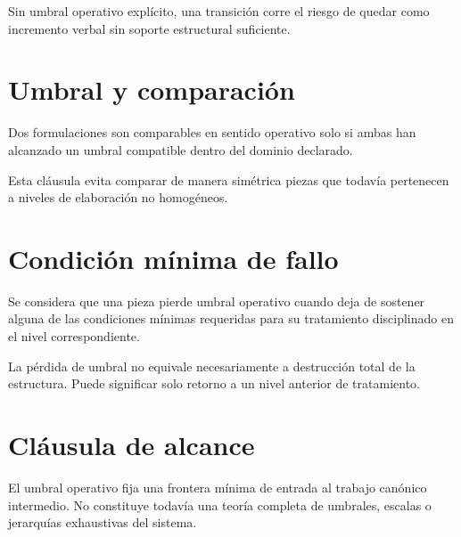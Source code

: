 \begin{observation}
Sin umbral operativo explícito, una transición corre el riesgo de quedar como incremento verbal sin soporte estructural suficiente.
\end{observation}

\section{Umbral y comparación}
\begin{definition}
Dos formulaciones son comparables en sentido operativo solo si ambas han alcanzado un umbral compatible dentro del dominio declarado.
\end{definition}

\begin{observation}
Esta cláusula evita comparar de manera simétrica piezas que todavía pertenecen a niveles de elaboración no homogéneos.
\end{observation}

\section{Condición mínima de fallo}
\begin{definition}
Se considera que una pieza pierde umbral operativo cuando deja de sostener alguna de las condiciones mínimas requeridas para su tratamiento disciplinado en el nivel correspondiente.
\end{definition}

\begin{observation}
La pérdida de umbral no equivale necesariamente a destrucción total de la estructura. Puede significar solo retorno a un nivel anterior de tratamiento.
\end{observation}

\section{Cláusula de alcance}
\begin{observation}
El umbral operativo fija una frontera mínima de entrada al trabajo canónico intermedio. No constituye todavía una teoría completa de umbrales, escalas o jerarquías exhaustivas del sistema.
\end{observation}

